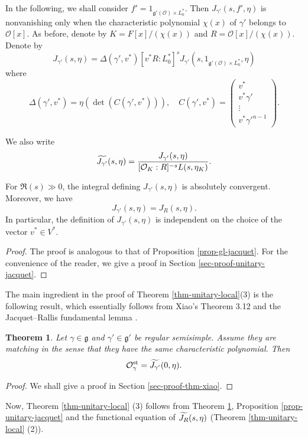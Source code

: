 \documentclass[a4paper]{amsart}
\newcommand{\CO}{{\mathcal {O}}} \newcommand{\CP}{{\mathcal {P}}}
\newcommand{\fg}{{\mathfrak{g}}} \newcommand{\fh}{{\mathfrak{h}}}
\newcommand{\st}{{\mathrm{st}}}\newcommand{\supp}{{\mathrm{supp}}}
\theoremstyle{plain}
\newtheorem{thm}{Theorem}[section] \newtheorem{cor}[thm]{Corollary}
\theoremstyle{remark} \newtheorem{remark}[thm]{Remark}
\theoremstyle{exercise} \newtheorem{exercise}[thm]{Exercise}
\theoremstyle{example} \newtheorem{example}[thm]{Example}
\theoremstyle{question} \newtheorem{question}[thm]{Question}
\theoremstyle{assumption} \newtheorem{assumption}[thm]{Assumption}
\numberwithin{equation}{section}
\begin{document}
In the following, we shall consider $f' = 1_{\fg'(\CO) \times L_0^*}$.
Then $J_{\gamma'}(s,f',\eta)$ is nonvanishing only when
the characteristic polynomial $\chi(x)$ of $\gamma'$ belongs to $\CO[x]$. As before, denote by $K = F[x]/(\chi(x))$ and
$R = \CO[x]/(\chi(x))$. Denote by 
\[J_{\gamma'}(s,\eta) = \Delta(\gamma',v^*)[v^*R:L_0^*]^s J_{\gamma'}\left( s,1_{\fg'(\CO) \times L_0^*},\eta \right)\]
where
\[\Delta(\gamma',v^*) = \eta(\det(C(\gamma',v^*))), \quad C(\gamma',v^*) = \begin{pmatrix}
v^* \\
v^*\gamma' \\
\vdots \\
v^*\gamma'^{n-1}
\end{pmatrix}.\]

We also write
\[\wt{J_{\gamma'}}(s,\eta) = \frac{J_{\gamma'}(s,\eta)}{[\CO_K:R]^{-s} L(s,\eta_K)}.\]


\begin{prop}\label{prop-unitary-jacquet}  For $\Re(s) \gg 0$, the integral defining $J_{\gamma'}(s,\eta)$
    is absolutely convergent. Moreover, we have
    \[J_{\gamma'}(s,\eta) = J_R(s,\eta).\]
     In particular, the definition of $J_{\gamma'}(s,\eta)$ is independent on the choice of the vector $v^* \in V^*$.
\end{prop}
\begin{proof}
    The proof is analogous to that of Proposition \ref{prop-gl-jacquet}. For the convenience of the reader, we give a
    proof in Section \ref{sec-proof-unitary-jacquet}.
\end{proof}





The main ingredient in the proof of Theorem \ref{thm-unitary-local}(3) is the following result, which essentially follows from Xiao's Theorem 3.12 \cite{Xia19} and the Jacquet--Rallis fundamental lemma \cite{Yun11,BP21}.

\begin{thm}\label{thm-xiao} Let $\gamma \in \fg$ and $\gamma' \in \fg'$ be regular semisimple. Assume they are matching in the
	sense that they have the same characteristic polynomial. Then
	\[\CO_\gamma^\st = \wt{J_{\gamma'}}(0,\eta).\]
\end{thm}
\begin{proof}
    We shall give a proof in Section \ref{sec-proof-thm-xiao}.
\end{proof}

Now, Theorem \ref{thm-unitary-local} (3) follows from  Theorem \ref{thm-xiao}, Proposition \ref{prop-unitary-jacquet} and
the functional equation of $\widetilde{J_R}(s,\eta)$ (Theorem \ref{thm-unitary-local} (2)). 
\end{document}
